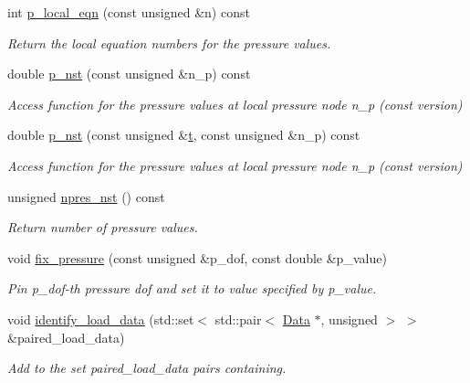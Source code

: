 \begin{DoxyCompactItemize}
int \hyperlink{classoomph_1_1GeneralisedNewtonianQTaylorHoodElement_aaf84cc52c787714cef5845f8750e469a}{p\+\_\+local\+\_\+eqn} (const unsigned \&n) const
\begin{DoxyCompactList}\small\item\em Return the local equation numbers for the pressure values. \end{DoxyCompactList}\item 
double \hyperlink{classoomph_1_1GeneralisedNewtonianQTaylorHoodElement_ab63500fdebdaa2123b503af982467d8a}{p\+\_\+nst} (const unsigned \&n\+\_\+p) const
\begin{DoxyCompactList}\small\item\em Access function for the pressure values at local pressure node n\+\_\+p (const version) \end{DoxyCompactList}\item 
double \hyperlink{classoomph_1_1GeneralisedNewtonianQTaylorHoodElement_a88023b1b2683128df3e56181b80105ea}{p\+\_\+nst} (const unsigned \&\hyperlink{cfortran_8h_af6f0bd3dc13317f895c91323c25c2b8f}{t}, const unsigned \&n\+\_\+p) const
\begin{DoxyCompactList}\small\item\em Access function for the pressure values at local pressure node n\+\_\+p (const version) \end{DoxyCompactList}\item 
unsigned \hyperlink{classoomph_1_1GeneralisedNewtonianQTaylorHoodElement_ab52245df561c368a6f0709374dba7136}{npres\+\_\+nst} () const
\begin{DoxyCompactList}\small\item\em Return number of pressure values. \end{DoxyCompactList}\item 
void \hyperlink{classoomph_1_1GeneralisedNewtonianQTaylorHoodElement_afdaae310f7879fb9191b730cdf81ade1}{fix\+\_\+pressure} (const unsigned \&p\+\_\+dof, const double \&p\+\_\+value)
\begin{DoxyCompactList}\small\item\em Pin p\+\_\+dof-\/th pressure dof and set it to value specified by p\+\_\+value. \end{DoxyCompactList}\item 
void \hyperlink{classoomph_1_1GeneralisedNewtonianQTaylorHoodElement_a93fa12a6111a676cb6e7ac2528266d07}{identify\+\_\+load\+\_\+data} (std\+::set$<$ std\+::pair$<$ \hyperlink{classoomph_1_1Data}{Data} $\ast$, unsigned $>$ $>$ \&paired\+\_\+load\+\_\+data)
\begin{DoxyCompactList}\small\item\em Add to the set {\ttfamily paired\+\_\+load\+\_\+data} pairs containing. \end{DoxyCompactList}\item 

\end{DoxyCompactItemize}
